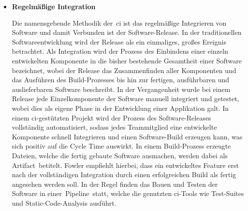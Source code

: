 \begin{itemize}
    \item {
        \textbf{Regelmäßige Integration}\par
        Die namensgebende Methodik der\ \acrshort{ci} ist das regelmäßige Integrieren von Software und damit Verbunden
        ist der Software-Release.
        In der traditionellen Softwareentwicklung wird der Release als ein einmaliges, großes Ereignis betrachtet.
        Als Integration wird der Prozess des Einbindens einer einzeln entwickelten Komponente in die bisher bestehende
        Gesamtheit einer Software bezeichnet, wobei der Release das Zusammenfinden aller Komponenten und das Ausführen
        des Build-Prozesses bis hin zur fertigen, ausführbaren und auslieferbaren Software beschreibt.
        In der Vergangenheit wurde bei einem Release jede Einzelkomponente der Software manuell integriert und getestet,
        wobei dies als eigene Phase in der Entwicklung einer Applikation galt.
        In einem \acrshort{ci}-gestützten Projekt wird der Prozess des Software-Releases vollständig automatisiert,
        sodass jedes Teammitglied eine entwickelte Komponente schnell Integrieren und einen Software-Build erzeugen
        kann, was sich positiv auf die Cycle Time auswirkt.
        In einem Build-Prozess erzeugte Dateien, welche die fertig gebaute Software ausmachen, werden dabei als\ \glqq
        Artifact\grqq\ betitelt.
        Fowler empfiehlt hierbei, dass ein entwickeltes Feature erst nach der vollständigen Integration durch einen
        erfolgreichen Build als fertig angesehen werden soll.
        In der Regel finden das Bauen und Testen der Software in einer\ \glqq Pipeline\grqq\ statt, welche die genutzten
        \acrshort{ci}-Tools wie Test-Suites und Static-Code-Analysis ausführt.
    }


\end{itemize}
